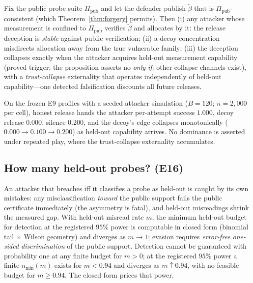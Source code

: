\begin{proposition}\label{prop:release}
Fix the public probe suite $\Pi_{\mathrm{pub}}$ and let the defender publish
$\tilde\beta$ that is $\Pi_{\mathrm{pub}}$-consistent (which
Theorem~\ref{thm:forgery} permits). Then (i) any attacker whose measurement is
confined to $\Pi_{\mathrm{pub}}$ verifies $\tilde\beta$ and allocates by it:
the release deception is \emph{stable} against public verification; (ii) a
decoy concentration misdirects allocation away from the true vulnerable
family; (iii) the deception collapses exactly when the attacker acquires
held-out measurement capability (proved trigger; the proposition asserts no \emph{only-if}:
other collapse channels exist), with a \emph{trust-collapse} externality
that operates independently of held-out capability---one detected
falsification discounts all future releases.
\end{proposition}

On the frozen E9 profiles with a seeded attacker simulation ($B=120$;
$n=2{,}000$ per cell), honest release hands the attacker per-attempt success
$1.000$, decoy release $0.000$, silence $0.200$, and the decoy's edge
collapses monotonically ($0.000\to0.100\to0.200$) as held-out capability
arrives. No dominance is asserted under repeated play, where the
trust-collapse externality accumulates.

\subsection{How many held-out probes? (E16)}\label{sec:budget}

\begin{proposition}\label{prop:budget}
An attacker that breaches iff it classifies a probe as held-out is caught by
its own mistakes: any misclassification \emph{toward} the public support fails
the public certificate immediately (the asymmetry is fatal), and held-out
misreadings shrink the measured gap. With held-out misread rate $m$, the
minimum held-out budget for detection at the registered $95\%$ power is
computable in closed form (binomial tail $\times$ Wilson geometry) and
diverges as $m\to1$; evasion requires \emph{error-free one-sided
discrimination} of the public support. Detection cannot be guaranteed with
probability one at any finite budget for $m>0$; at the registered $95\%$
power a finite $n_{\min}(m)$ exists for $m<0.94$ and diverges as
$m\uparrow0.94$, with no feasible budget for $m\ge0.94$. The closed form
prices that power.
\end{proposition}

